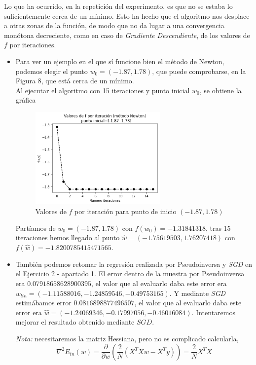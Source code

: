 \documentclass[11pt,a4paper]{article}
\theoremstyle{definition}
\begin{document}
	Lo que ha ocurrido, en la repetición del experimento, es que no se estaba lo suficientemente cerca de un mínimo. Esto ha hecho que el algoritmo nos desplace a otras zonas de la función, de modo que no da lugar a una convergencia monótona decreciente, como en caso de \textit{Gradiente Descendiente}, de los valores de $f$ por iteraciones.\\
	\begin{itemize}
	\item 	Para ver un ejemplo en el que sí funcione bien el método de Newton, podemos elegir el punto $w_0=(-1.87,1.78)$, que puede comprobarse, en la Figura 8, que está cerca de un mínimo. \\
	Al ejecutar el algoritmo con 15 iteraciones y punto inicial $w_0$, se obtiene la gráfica
	\begin{figure}[H]
		\centering
		\includegraphics[width=0.63\textwidth]{images/ult_newton}
		\caption{Valores de $f$ por iteración para punto de inicio $(-1.87,1.78)$}
	\end{figure}
	Partíamos de $w_0=(-1.87,1.78)$ con $f(w_0)=-1.31841318$, tras 15 iteraciones hemos llegado al punto $\hat w = (-1.75619503, 1.76207418)$ con $f(\hat w)=-1.8200785415471565$.\\
	
	\item También podemos retomar la regresión realizada por Pseudoinversa y \textit{SGD} en el Ejercicio 2 - apartado 1. El error dentro de la muestra por Pseudoinversa era $0.07918658628900395$, el valor que al evaluarlo daba este error era $w_{lin}=(-1.11588016,-1.24859546,-0.49753165)$. Y mediante \textit{SGD} estimábamos error $0.0816898877496507$, el valor que al evaluarlo daba este error era $\hat w=(-1.24069346, -0.17997056, -0.46016084)$. Intentaremos mejorar el resultado obtenido mediante $\textit{SGD}$.
	
	\textit{Nota:} necesitaremos la matriz Hessiana, pero no es complicado calcularla,
	$$\nabla ^2 E_{in}(w)= \frac{\partial}{\partial w} \left(\frac{2}{N}(X^TXw-X^Ty)\right)=\frac{2}{N}X^TX$$


\end{itemize}
\end{document}
